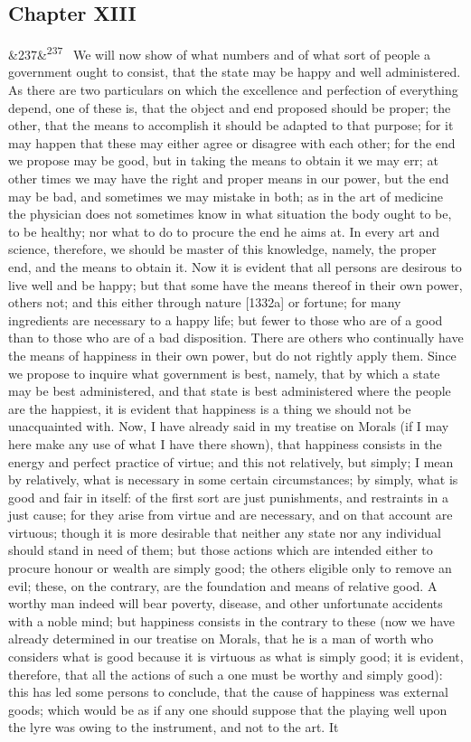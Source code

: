 \documentclass[12pt]{article}
\newcommand{\para}[1][]{\par\noindent\ifx&#1&\else\textsuperscript{\footnotesize #1}~\fi}
\begin{document}
\subsection*{Chapter XIII}

\para[237] We will now show of what numbers and of what sort of people a government ought to consist, that the state may be happy and well administered. As there are two particulars on which the excellence and perfection of everything depend, one of these is, that the object and end proposed should be proper; the other, that the means to accomplish it should be adapted to that purpose; for it may happen that these may either agree or disagree with each other; for the end we propose may be good, but in taking the means to obtain it we may err; at other times we may have the right and proper means in our power, but the end may be bad, and sometimes we may mistake in both; as in the art of medicine the physician does not sometimes know in what situation the body ought to be, to be healthy; nor what to do to procure the end he aims at. In every art and science, therefore, we should be master of this knowledge, namely, the proper end, and the means to obtain it. Now it is evident that all persons are desirous to live well and be happy; but that some have the means thereof in their own power, others not; and this either through nature [1332a] or fortune; for many ingredients are necessary to a happy life; but fewer to those who are of a good than to those who are of a bad disposition. There are others who continually have the means of happiness in their own power, but do not rightly apply them. Since we propose to inquire what government is best, namely, that by which a state may be best administered, and that state is best administered where the people are the happiest, it is evident that happiness is a thing we should not be unacquainted with. Now, I have already said in my treatise on Morals (if I may here make any use of what I have there shown), that happiness consists in the energy and perfect practice of virtue; and this not relatively, but simply; I mean by relatively, what is necessary in some certain circumstances; by simply, what is good and fair in itself: of the first sort are just punishments, and restraints in a just cause; for they arise from virtue and are necessary, and on that account are virtuous; though it is more desirable that neither any state nor any individual should stand in need of them; but those actions which are intended either to procure honour or wealth are simply good; the others eligible only to remove an evil; these, on the contrary, are the foundation and means of relative good. A worthy man indeed will bear poverty, disease, and other unfortunate accidents with a noble mind; but happiness consists in the contrary to these (now we have already determined in our treatise on Morals, that he is a man of worth who considers what is good because it is virtuous as what is simply good; it is evident, therefore, that all the actions of such a one must be worthy and simply good): this has led some persons to conclude, that the cause of happiness was external goods; which would be as if any one should suppose that the playing well upon the lyre was owing to the instrument, and not to the art. It 
\end{document}
